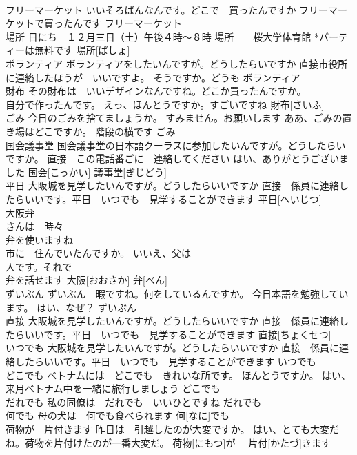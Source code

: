 \documentclass[8pt]{extreport}
\begin{document}
\begin{CJK}{UTF8}{min}
\\	フリーマーケット	いいそろばんなんです。どこで　買ったんですか フリーマーケットで買ったんです	フリーマーケット						
\\	場所	日にち　１２月三日（土）午後４時～８時 場所　　桜大学体育館 *パーティーは無料です	場所[ばしょ]					
\\	ボランティア	ボランティアをしたいんですが。どうしたらいですか 直接市役所に連絡したほうが　いいですよ。 そうですか。どうも	ボランティア						
\\	財布	その財布は　いいデザインなんですね。どこか買ったんですか。 
\\	自分で作ったんです。 えっ、ほんとうですか。すごいですね	財布[さいふ]					
\\	ごみ	今日のごみを捨てましょうか。 すみません。お願いします ああ、ごみの置き場はどこですか。 階段の横です	ごみ						
\\	国会議事堂	国会議事堂の日本語クーラスに参加したいんですが。どうしたらいですか。 直接　この電話番ごに　連絡してください はい、ありがとうございました	国会[こっかい] 議事堂[ぎじどう]					
\\	平日	大阪城を見学したいんですが。どうしたらいいですか 直接　係員に連絡したらいいです。平日　いつでも　見学することができます	平日[へいじつ]					
\\	大阪弁	
\\	さんは　時々　
\\	弁を使いますね 
\\	市に　住んでいたんですか。 いいえ、父は　
\\	人です。それで　
\\	弁を話せます	大阪[おおさか] 弁[べん]					
\\	ずいぶん	ずいぶん　暇ですね。何をしているんですか。 今日本語を勉強しています。 はい、なぜ？	ずいぶん			
\\	直接	大阪城を見学したいんですが。どうしたらいいですか 直接　係員に連絡したらいいです。平日　いつでも　見学することができます	直接[ちょくせつ]					
\\	いつでも	大阪城を見学したいんですが。どうしたらいいですか 直接　係員に連絡したらいいです。平日　いつでも　見学することができます	いつでも			
\\	どこでも	ベトナムには　どこでも　きれいな所です。 ほんとうですか。 はい、来月ベトナム中を一緒に旅行しましょう	どこでも			
\\	だれでも	私の同僚は　だれでも　いいひとですね	だれでも			
\\	何でも	母の犬は　何でも食べられます	何[なに]でも			
\\	荷物が　片付きます	昨日は　引越したのが大変ですか。 はい、とても大変だね。荷物を片付けたのが一番大変だ。	荷物[にもつ]が　 片付[かたづ]きます				

\end{CJK}
\end{document}
